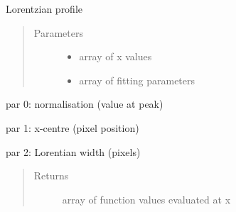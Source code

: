 \documentclass[letterpaper,10pt,english]{sphinxmanual}
\begin{document}

\begin{fulllineitems}
\label{\detokenize{images_functions:images.lorentzian}}
Lorentzian profile
\begin{quote}\begin{description}
\item[{Parameters}] \leavevmode\begin{itemize}
\item {} 
 \textendash{} array of x values

\item {} 
 \textendash{} array of fitting parameters

\end{itemize}

\end{description}\end{quote}

\begin{DUlineblock}{0em}
\item[] par 0: normalisation (value at peak)
\item[] par 1: x-centre (pixel position)
\item[] par 2: Lorentian width (pixels)
\end{DUlineblock}
\begin{quote}\begin{description}
\item[{Returns}] \leavevmode
array of function values evaluated at x

\end{description}\end{quote}

\end{fulllineitems}

\end{document}
